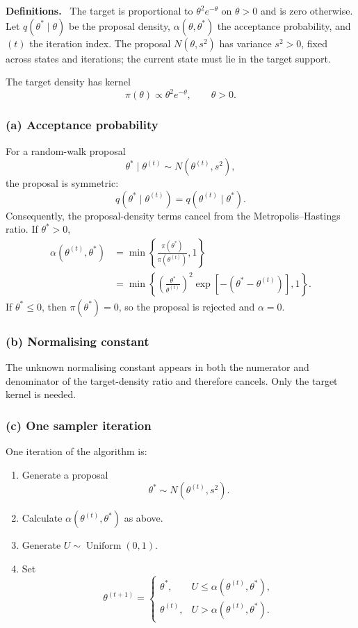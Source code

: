 \documentclass[11pt,a4paper]{article}
\newcommand{\given}{\mathrel{|}}
\newcommand{\studyheading}[1]{%
  \par\medskip\noindent\textcolor{statblue}{\textbf{#1.}}\ }
\begin{document}
\studyheading{Definitions}
The target is proportional to $\theta^2e^{-\theta}$ on $\theta>0$ and is zero otherwise.
Let $q(\theta^*\given\theta)$ be the proposal density, $\alpha(\theta,\theta^*)$ the acceptance probability, and $(t)$ the iteration index.
The proposal $N(\theta,s^2)$ has variance $s^2>0$, fixed across states and iterations; the current state must lie in the target support.

The target density has kernel
\[
\pi(\theta)\propto \theta^2e^{-\theta},
\qquad \theta>0.
\]

\subsubsection*{(a) Acceptance probability}

For a random-walk proposal
\[
\theta^*\mid\theta^{(t)}\sim N\left(\theta^{(t)},s^2\right),
\]
the proposal is symmetric:
\[
q(\theta^*\mid\theta^{(t)})
=q(\theta^{(t)}\mid\theta^*).
\]
Consequently, the proposal-density terms cancel from the
Metropolis--Hastings ratio. If \(\theta^*>0\),
\begin{align*}
\alpha\left(\theta^{(t)},\theta^*\right)
&=
\min\left\{
\frac{\pi(\theta^*)}{\pi(\theta^{(t)})},1
\right\}\\
&=
\boxed{
\min\left\{
\left(\frac{\theta^*}{\theta^{(t)}}\right)^2
\exp\left[-\left(\theta^*-\theta^{(t)}\right)\right],
1
\right\}.
}
\end{align*}
If \(\theta^*\leq 0\), then \(\pi(\theta^*)=0\), so the proposal is rejected
and \(\alpha=0\).

\subsubsection*{(b) Normalising constant}

The unknown normalising constant appears in both the numerator and denominator
of the target-density ratio and therefore cancels. Only the target kernel is
needed.

\subsubsection*{(c) One sampler iteration}

One iteration of the algorithm is:
\begin{enumerate}
    \item Generate a proposal
    \[
    \theta^*\sim N\left(\theta^{(t)},s^2\right).
    \]
    \item Calculate \(\alpha(\theta^{(t)},\theta^*)\) as above.
    \item Generate \(U\sim\operatorname{Uniform}(0,1)\).
    \item Set
    \[
    \theta^{(t+1)}=
    \begin{cases}
    \theta^*, & U\leq\alpha(\theta^{(t)},\theta^*),\\
    \theta^{(t)}, & U>\alpha(\theta^{(t)},\theta^*).
    \end{cases}
    \]
\end{enumerate}
\end{document}
